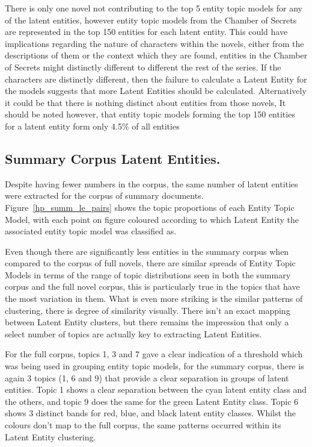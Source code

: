 \documentclass[10pt]{report}
\begin{document}
There is only one novel not contributing to the top 5 entity topic models for any of the latent entities, however entity topic models from the Chamber of Secrets are represented in the top 150 entities for each latent entity. This could have implications regarding the nature of characters within the novels, either from the descriptions of them or the context which they are found, entities in the Chamber of Secrets might distinctly different to different the rest of the series. If the characters are distinctly different, then the failure to calculate a Latent Entity for the models suggests that more Latent Entities should be calculated. Alternatively it could be that there is nothing distinct about entities from those novels, It should be noted however, that entity topic models forming the top 150 entities for a latent entity form only 4.5\% of all entities

\clearpage
\subsection{Summary Corpus Latent Entities.}

Despite having fewer numbers in the corpus, the same number of latent entities were extracted for the corpus of summary documents. Figure~\ref{hp_summ_le_pairs} shows the topic proportions of each Entity Topic Model, with each point on figure coloured according to which Latent Entity the associated entity topic model was classified as.

Even though there are significantly less entities in the summary corpus when compared to the corpus of full novels, there are similar spreads of Entity Topic Models in terms of the range of topic distributions seen in both the summary corpus and the full novel corpus, this is particularly true in the topics that have the most variation in them. What is even more striking is the similar patterns of clustering, there is  degree of similarity visually. There isn't an exact mapping between Latent Entity clusters, but there remains the impression that only a select number of topics are actually key to extracting Latent Entities.

For the full corpus, topics 1, 3 and 7 gave a clear indication of a threshold which was being used in grouping entity topic models, for the summary corpus, there is again 3 topics (1, 6 and 9) that provide a clear separation in groups of latent entities. Topic 1 shows a clear separation between the cyan latent entity class and the others, and topic 9 does the same for the green Latent Entity class. Topic 6 shows 3 distinct bands for red, blue, and black latent entity classes. Whilst the colours don't map to the full corpus, the same patterns occurred within its Latent Entity clustering.
\end{document}
